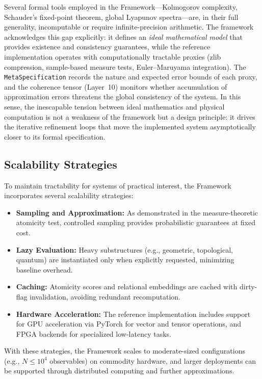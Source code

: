 Several formal tools employed in the \Apeiron{} Framework---Kolmogorov complexity, Schauder's fixed-point theorem, global Lyapunov spectra---are, in their full generality, incomputable or require infinite-precision arithmetic. The framework acknowledges this gap explicitly: it defines an \emph{ideal mathematical model} that provides existence and consistency guarantees, while the reference implementation operates with computationally tractable proxies (zlib compression, sample-based measure tests, Euler--Maruyama integration). The \texttt{MetaSpecification} records the nature and expected error bounds of each proxy, and the coherence tensor (Layer~10) monitors whether accumulation of approximation errors threatens the global consistency of the system. In this sense, the inescapable tension between ideal mathematics and physical computation is not a weakness of the framework but a design principle: it drives the iterative refinement loops that move the implemented system asymptotically closer to its formal specification.

\subsection{Scalability Strategies}

To maintain tractability for systems of practical interest, the \Apeiron{} Framework incorporates several scalability strategies:

\begin{itemize}
    \item \textbf{Sampling and Approximation:} As demonstrated in the measure-theoretic atomicity test, controlled sampling provides probabilistic guarantees at fixed cost.
    \item \textbf{Lazy Evaluation:} Heavy substructures (e.g., geometric, topological, quantum) are instantiated only when explicitly requested, minimizing baseline overhead.
    \item \textbf{Caching:} Atomicity scores and relational embeddings are cached with dirty-flag invalidation, avoiding redundant recomputation.
    \item \textbf{Hardware Acceleration:} The reference implementation includes support for GPU acceleration via PyTorch for vector and tensor operations, and FPGA backends for specialized low-latency tasks.
\end{itemize}

With these strategies, the \Apeiron{} Framework scales to moderate-sized configurations (e.g., $N \le 10^4$ observables) on commodity hardware, and larger deployments can be supported through distributed computing and further approximations.

